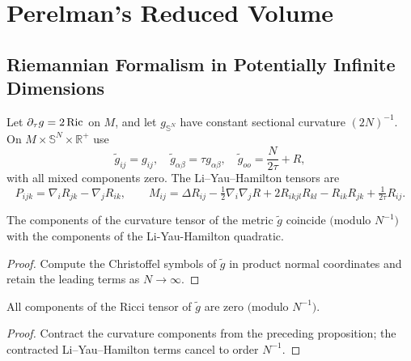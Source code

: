 \chapter{Perelman's Reduced Volume}
\label{chap:cz-reduced-volume}

\section{Riemannian Formalism in Potentially Infinite Dimensions}

Let $\partial_\tau g=2\operatorname{Ric}$ on $M$, and let $g_{\mathbb S^N}$ have
constant sectional curvature $(2N)^{-1}$.  On
$M\times\mathbb S^N\times\mathbb R^+$ use
\[
\tilde g_{ij}=g_{ij},\quad \tilde g_{\alpha\beta}=\tau g_{\alpha\beta},
\quad \tilde g_{oo}=\frac N{2\tau}+R,
\]
with all mixed components zero.  The Li--Yau--Hamilton tensors are
\[
P_{ijk}=\nabla_iR_{jk}-\nabla_jR_{ik},\qquad
M_{ij}=\Delta R_{ij}-\tfrac12\nabla_i\nabla_jR
+2R_{ikjl}R_{kl}-R_{ik}R_{jk}+\tfrac1{2\tau}R_{ij}.
\]

\begin{proposition}
  \label{prop:cz-space-time-curvature-and-the-liyauhamilton-quadratic}
The components of the curvature tensor of the metric $\tilde{g}$
coincide $($modulo $N^{-1})$ with the components of the
Li-Yau-Hamilton quadratic.
\end{proposition}

\begin{proof}
  \sketch Compute the Christoffel symbols of $\tilde g$ in product normal coordinates and retain the leading terms as $N\to\infty$.
\end{proof}

\begin{corollary}
  \label{cor:cz-space-time-ricci-flatness-modulo-inverse-dimension}
All components of the Ricci tensor of $\tilde{g}$ are zero
$($modulo $N^{-1})$.
\end{corollary}

\begin{proof}
  \sketch Contract the curvature components from the preceding proposition; the contracted Li--Yau--Hamilton terms cancel to order $N^{-1}$.
\end{proof}

